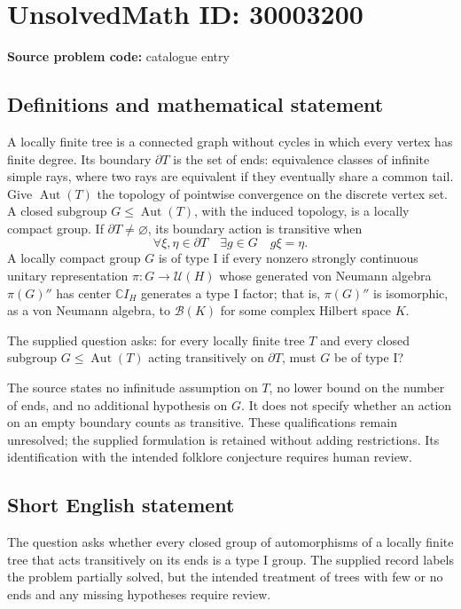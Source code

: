\documentclass[11pt]{article}
\begin{document}
\section*{UnsolvedMath ID: 30003200}
\textbf{Source problem code:} catalogue entry
\subsection{Definitions and mathematical statement}
A locally finite tree is a connected graph without cycles in which every vertex has finite degree. Its boundary \(\partial T\) is the set of ends: equivalence classes of infinite simple rays, where two rays are equivalent if they eventually share a common tail. Give \(\operatorname{Aut}(T)\) the topology of pointwise convergence on the discrete vertex set. A closed subgroup \(G\leq\operatorname{Aut}(T)\), with the induced topology, is a locally compact group. If \(\partial T\neq\varnothing\), its boundary action is transitive when
\[
\forall\xi,\eta\in\partial T\quad\exists g\in G\quad g\xi=\eta.
\]
A locally compact group \(G\) is of type I if every nonzero strongly continuous unitary representation \(\pi:G\to\mathcal U(H)\) whose generated von Neumann algebra \(\pi(G)''\) has center \(\mathbb C I_H\) generates a type I factor; that is, \(\pi(G)''\) is isomorphic, as a von Neumann algebra, to \(\mathcal B(K)\) for some complex Hilbert space \(K\).

The supplied question asks: for every locally finite tree \(T\) and every closed subgroup \(G\leq\operatorname{Aut}(T)\) acting transitively on \(\partial T\), must \(G\) be of type I?

The source states no infinitude assumption on \(T\), no lower bound on the number of ends, and no additional hypothesis on \(G\). It does not specify whether an action on an empty boundary counts as transitive. These qualifications remain unresolved; the supplied formulation is retained without adding restrictions. Its identification with the intended folklore conjecture requires human review.
\subsection{Short English statement}
The question asks whether every closed group of automorphisms of a locally finite tree that acts transitively on its ends is a type I group. The supplied record labels the problem partially solved, but the intended treatment of trees with few or no ends and any missing hypotheses require review.
\end{document}
